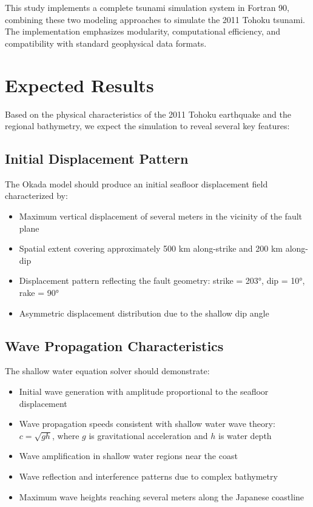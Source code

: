 \documentclass[12pt]{article}
\begin{document}
This study implements a complete tsunami simulation system in Fortran 90, combining these two modeling approaches to simulate the 2011 Tohoku tsunami. The implementation emphasizes modularity, computational efficiency, and compatibility with standard geophysical data formats.

\section{Expected Results}

Based on the physical characteristics of the 2011 Tohoku earthquake and the regional bathymetry, we expect the simulation to reveal several key features:

\subsection{Initial Displacement Pattern}
The Okada model should produce an initial seafloor displacement field characterized by:
\begin{itemize}
    \item Maximum vertical displacement of several meters in the vicinity of the fault plane
    \item Spatial extent covering approximately 500 km along-strike and 200 km along-dip
    \item Displacement pattern reflecting the fault geometry: strike = 203°, dip = 10°, rake = 90°
    \item Asymmetric displacement distribution due to the shallow dip angle
\end{itemize}

\subsection{Wave Propagation Characteristics}
The shallow water equation solver should demonstrate:
\begin{itemize}
    \item Initial wave generation with amplitude proportional to the seafloor displacement
    \item Wave propagation speeds consistent with shallow water wave theory: $c = \sqrt{gh}$, where $g$ is gravitational acceleration and $h$ is water depth
    \item Wave amplification in shallow water regions near the coast
    \item Wave reflection and interference patterns due to complex bathymetry
    \item Maximum wave heights reaching several meters along the Japanese coastline
\end{itemize}
\end{document}
